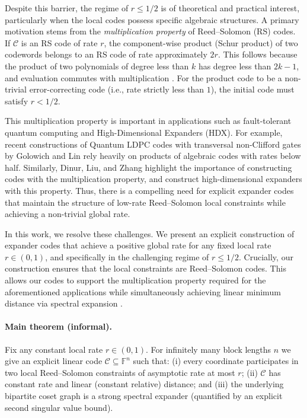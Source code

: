 \documentclass[11pt]{article}
\theoremstyle{plain}
\theoremstyle{definition}
\begin{document}
Despite this barrier, the regime of $r \le 1/2$ is of  theoretical and practical interest, particularly when the local codes possess specific algebraic structures. A primary motivation stems from the \emph{multiplication property} of Reed--Solomon (RS) codes. If $\mathcal{C}$ is an RS code of rate $r$, the component-wise product (Schur product) of two codewords belongs to an RS code of rate approximately $2r$.
This follows because the product of two polynomials of degree less than $k$ has degree less than $2k-1$, and evaluation commutes with multiplication \cite{randriambololona2015products}.
For the product code to be a non-trivial error-correcting code (i.e., rate strictly less than $1$), the initial code must satisfy $r < 1/2$.

This multiplication property is important in applications such as fault-tolerant quantum computing and High-Dimensional Expanders (HDX). For example, recent constructions of Quantum LDPC codes with transversal non-Clifford gates by Golowich and Lin \cite{golowich2024quantum} rely heavily on products of algebraic codes with rates below half. Similarly, Dinur, Liu, and Zhang \cite{dinur2023new} highlight the importance of constructing codes with the multiplication property, and construct high-dimensional expanders with this property. Thus, there is a compelling need for explicit expander codes that maintain the structure of low-rate Reed--Solomon local constraints while achieving a non-trivial global rate.

In this work, we resolve these challenges. We present an explicit construction of expander codes that achieve a positive global rate for any fixed local rate $r \in (0, 1)$, and specifically in the challenging regime of $r \le 1/2$. Crucially, our construction ensures that the local constraints are Reed--Solomon codes. This allows our codes to support the multiplication property required for the aforementioned applications while simultaneously achieving linear minimum distance via spectral expansion \cite{barg2006distance}.

\paragraph{Main theorem (informal).}
Fix any constant local rate $r\in(0,1)$. For infinitely many block lengths $n$ we give an explicit linear code $\mathcal{C}\subseteq \mathbb{F}^n$ such that:
(i) every coordinate participates in two local Reed--Solomon constraints of asymptotic rate at most $r$;
(ii) $\mathcal{C}$ has constant rate and linear (constant relative) distance; and
(iii) the underlying bipartite coset graph is a strong spectral expander (quantified by an explicit second singular value bound).
\end{document}
